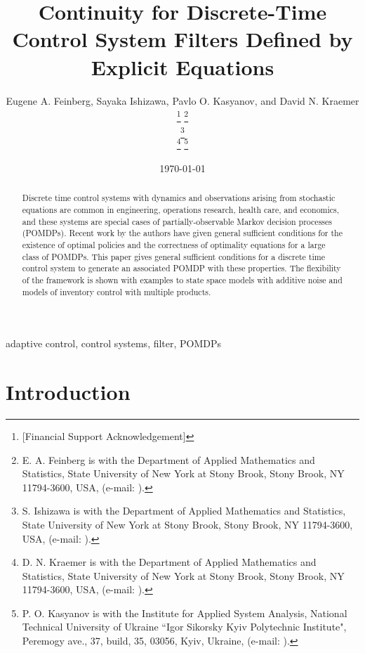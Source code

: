 \documentclass[11pt,onecolumn]{IEEEtran}  %
\title{%
    Continuity for Discrete-Time Control System Filters Defined by Explicit Equations
}
\author{
    Eugene A. Feinberg,
    Sayaka Ishizawa, %
    Pavlo O. Kasyanov,
    and David N. Kraemer %
    \thanks{%
        [Financial Support Acknowledgement]
    }
    \thanks{%
        E. A. Feinberg is with the Department of Applied Mathematics and Statistics, State University of New York at Stony Brook, Stony Brook, NY 11794-3600, USA, (e-mail: \email{eugene.feinberg@stonybrook.edu}).
    }

    \thanks{%
        S. Ishizawa is with the Department of Applied Mathematics and Statistics, State University of New York at Stony Brook, Stony Brook, NY 11794-3600, USA, (e-mail: \email{sayaka.ishizawa@stonybrook.edu}).
    }

    \thanks{%
        D. N. Kraemer is with the Department of Applied Mathematics and Statistics, State University of New York at Stony Brook, Stony Brook, NY 11794-3600, USA, (e-mail: \email{david.kraemer@stonybrook.edu}).
    }
    \thanks{%
        P. O. Kasyanov is with the Institute for Applied System Analysis, National Technical University of Ukraine “Igor Sikorsky Kyiv Polytechnic Institute", Peremogy ave., 37, build, 35, 03056, Kyiv, Ukraine, (e-mail: \email{kasyanov@i.ua}).
    }
}
\date{\today}
\theoremstyle{definition}
\begin{document}

\doublespacing

\maketitle

\begin{abstract}
    Discrete time control systems with dynamics and observations arising from stochastic equations are common in engineering, operations research, health care, and economics, and these systems are special cases of partially-observable Markov decision processes (POMDPs). Recent work by the authors have given general sufficient conditions for the existence of optimal policies and the correctness of optimality equations for a large class of POMDPs. This paper gives general sufficient conditions for a discrete time control system to generate an associated POMDP with these properties. The flexibility of the framework is shown with examples to state space models with additive noise and models of inventory control with multiple products.
\end{abstract}

\begin{IEEEkeywords}
    adaptive control, control systems, filter, POMDPs
\end{IEEEkeywords}

\section{Introduction} \label{sec:introduction}
\end{document}
